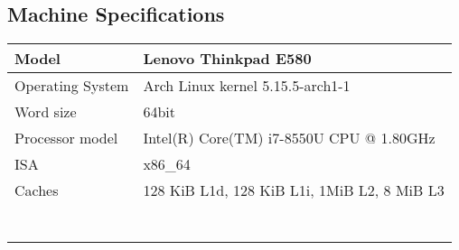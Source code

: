 \begin{appendices}
\section{Machine Specifications}
\label{appendix:machine-specs}
\begin{table}[H]
\begin{tabular}{ll}
\hline
\multicolumn{1}{|l|}{Model}            & \multicolumn{1}{l|}{Lenovo Thinkpad E580}                        \\ \hline
\multicolumn{1}{|l|}{Operating System} & \multicolumn{1}{l|}{Arch Linux kernel 5.15.5-arch1-1}            \\ \hline
\multicolumn{1}{|l|}{Word size}        & \multicolumn{1}{l|}{64bit}                                       \\ \hline
\multicolumn{1}{|l|}{Processor model}  & \multicolumn{1}{l|}{Intel(R) Core(TM) i7-8550U CPU @ 1.80GHz}    \\ \hline
\multicolumn{1}{|l|}{ISA}              & \multicolumn{1}{l|}{x86\_64}                                     \\ \hline
\multicolumn{1}{|l|}{Caches}           & \multicolumn{1}{l|}{128 KiB L1d, 128 KiB L1i, 1MiB L2, 8 MiB L3} \\ \hline
                                       &                                                                  \\
                                       &                                                                  \\
                                       &                                                                  \\
                                       &                                                                  \\
                                       &                                                                  \\
                                       &                                                                  \\
                                       &                                                                 
\end{tabular}
\end{table}
\end{appendices}
